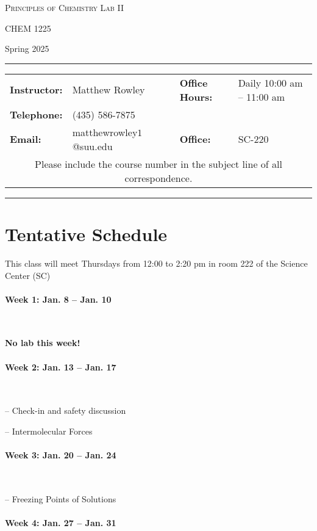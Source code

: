 \documentclass[12pt, letterpaper]{article}
\begin{document}
\begin{center}
{\Large \textsc{Principles of Chemistry Lab II}}

CHEM 1225
\end{center}

\begin{center}
	{\large Spring 2025}
\end{center}
\begin{center}
	\rule{0.99\textwidth}{0.4pt}
	\begin{tabular}{llcll}
		\textbf{Instructor:} & Matthew Rowley           &  & \textbf{Office Hours:} & Daily 10:00 am -- 11:00 am \\
		\textbf{Telephone:}  & (435) 586-7875           &  &                        &                            \\
		\textbf{Email:}      & matthewrowley$1$@suu.edu &  & \textbf{Office:}       & SC-220                     \\
		\multicolumn{5}{c}{Please include the course number in the subject line of all correspondence.}
	\end{tabular}
	\rule{0.99\textwidth}{0.4pt}
\end{center}

\section*{Tentative Schedule}
This class will meet Thursdays from 12:00 to 2:20 pm in room 222 of the Science Center (SC)

\paragraph{Week 1: Jan. 8 -- Jan. 10}~

\textbf{No lab this week!}

\paragraph{Week 2: Jan. 13 -- Jan. 17}~

-- Check-in and safety discussion

-- Intermolecular Forces

\paragraph{Week 3: Jan. 20 -- Jan. 24}~

-- Freezing Points of Solutions

\paragraph{Week 4: Jan. 27 -- Jan. 31}~
\end{document}
